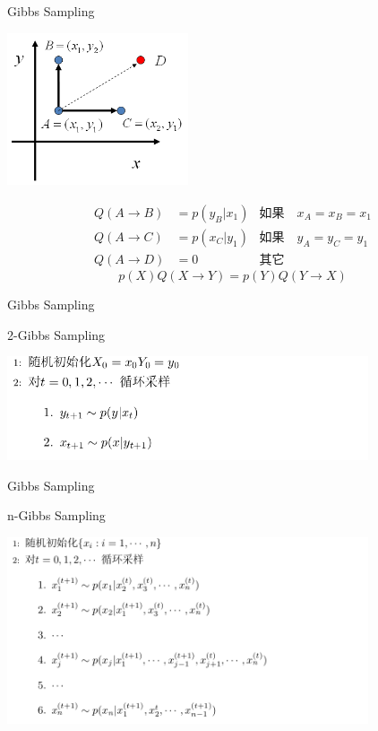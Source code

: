 \documentclass{beamer}
\begin{document}
\begin{CJK*}{UTF8}{gbsn}
\begin{frame}{Gibbs Sampling}
\begin{center}
      \includegraphics[width=0.4\textwidth]{picture/ABCD.png}
    \end{center} 
\begin{align*}
Q(A\rightarrow B) & = p(y_B|x_1) & \text{如果} \quad x_A=x_B=x_1 \\
Q(A\rightarrow C) & = p(x_C|y_1) & \text{如果} \quad y_A=y_C=y_1 \\
Q(A\rightarrow D) &= 0 & \text{其它} 
\end{align*}
$$ p(X)Q(X\rightarrow Y) = p(Y) Q(Y\rightarrow X) $$
\end{frame}

\begin{frame}{Gibbs Sampling}
\begin{block}{2-Gibbs Sampling}
\begin{center}
\includegraphics[width=0.8\textwidth]{picture/2Gibs.png}
\end{center}
\end{block}
\end{frame}


\begin{frame}{Gibbs Sampling}
\begin{block}{n-Gibbs Sampling}
\begin{center}
\includegraphics[width=0.8\textwidth]{picture/nGibs.png}
\end{center}
\end{block}
\end{frame}


\end{CJK*}
\end{document}
